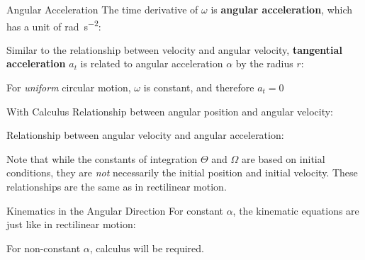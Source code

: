 \documentclass[12pt,compress,aspectratio=169]{beamer}
\begin{document}
\begin{frame}{Angular Acceleration}
  The time derivative of $\omega$ is \textbf{angular acceleration}, which
  has a unit of \si{\radian\per\second\squared}:


  Similar to the relationship between velocity and angular velocity,
  \textbf{tangential acceleration} $a_t$ is related to angular acceleration
  $\alpha$ by the radius $r$:
    
    
  For \emph{uniform} circular motion, $\omega$ is constant, and therefore
  $a_t=0$
\end{frame}



\begin{frame}{With Calculus}
  Relationship between angular position and angular velocity:


  Relationship between angular velocity and angular acceleration:


  Note that while the constants of integration $\Theta$ and $\Omega$ are based
  on initial conditions, they are \emph{not} necessarily the initial position
  and initial velocity. These relationships are the same as in rectilinear
  motion.
\end{frame}




\begin{frame}{Kinematics in the Angular Direction}
  For constant $\alpha$, the kinematic equations are just like in rectilinear
  motion:

  \vspace{-.3in}{\large
    \begin{align*}
      \theta(t) &=\theta_0 + \omega_0 t + \frac12\alpha t^2\\
      \omega(t) &=\omega_0+ \alpha t\\
      \omega(\theta)^2& = \omega_0^2+ 2\alpha(\theta-\theta_0)
    \end{align*}
  }
  
  For non-constant $\alpha$, calculus will be required.
\end{frame}
\end{document}
